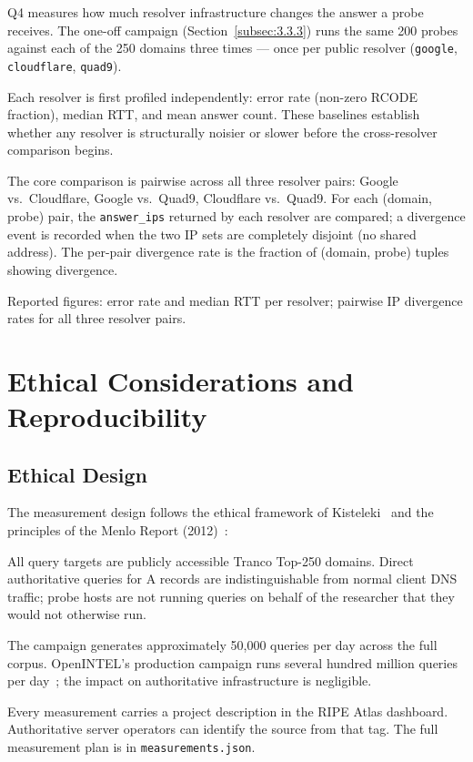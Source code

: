 Q4 measures how much resolver infrastructure changes the answer a probe receives. The one-off campaign (Section~\ref{subsec:3.3.3}) runs the same 200 probes against each of the 250 domains three times --- once per public resolver (\texttt{google}, \texttt{cloudflare}, \texttt{quad9}).

Each resolver is first profiled independently: error rate (non-zero RCODE fraction), median \ac{RTT}, and mean answer count. These baselines establish whether any resolver is structurally noisier or slower before the cross-resolver comparison begins.

The core comparison is pairwise across all three resolver pairs: Google vs.\ Cloudflare, Google vs.\ Quad9, Cloudflare vs.\ Quad9. For each (domain, probe) pair, the \texttt{answer\_ips} returned by each resolver are compared; a divergence event is recorded when the two \ac{IP} sets are completely disjoint (no shared address). The per-pair divergence rate is the fraction of (domain, probe) tuples showing divergence.

Reported figures: error rate and median \ac{RTT} per resolver; pairwise \ac{IP} divergence rates for all three resolver pairs.

\bigskip
\section{Ethical Considerations and Reproducibility}
\label{sec:3.6}

\subsection{Ethical Design}
\label{subsec:3.6.1}

The measurement design follows the ethical framework of Kisteleki~\cite{Kisteleki2016} and the principles of the Menlo Report (2012)~\cite{Bailey2012}:

All query targets are publicly accessible Tranco Top-250 domains. Direct authoritative queries for \ac{A} records are indistinguishable from normal client \ac{DNS} traffic; probe hosts are not running queries on behalf of the researcher that they would not otherwise run.

The campaign generates approximately 50,000 queries per day across the full corpus. OpenINTEL's production campaign runs several hundred million queries per day~\cite{vanRijswijk2016}; the impact on authoritative infrastructure is negligible.

Every measurement carries a project description in the RIPE Atlas dashboard. Authoritative server operators can identify the source from that tag. The full measurement plan is in \texttt{measurements.json}.


